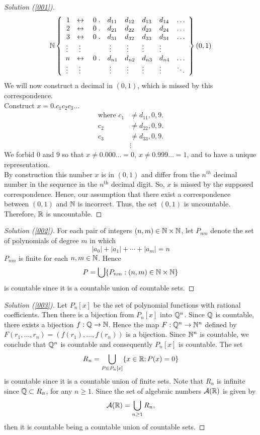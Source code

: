 \documentclass[	DIV=calc,paper=a4,fontsize=11pt]{scrartcl}	 	%
\theoremstyle{definition}
\theoremstyle{plain}
\theoremstyle{remark}
\begin{document}
\begin{proof}[Solution (\ref{001})]
  \[ \Bbb N \left\{\begin{array}{rllllll}
  1 & \leftrightarrow \quad0\;.&d_{11}&d_{12}&d_{13}&d_{14}&\ldots\\
  2 & \leftrightarrow \quad0\;.&d_{21}&d_{22}&d_{23}&d_{24}&\ldots\\
  3 & \leftrightarrow \quad0\;.&d_{31}&d_{32}&d_{33}&d_{34}&\ldots\\
  \vdots\; & \;\vdots&\;\vdots&\;\vdots\;&\vdots&\vdots \\
  n & \leftrightarrow \quad0\;.&d_{n1}&d_{n2}&d_{n3}&d_{n4}&\ldots\\
  \vdots\; & \;\vdots&\;\vdots&\;\vdots\;&\vdots&\vdots&\ddots
  \end{array}\right\} (0,1)
\]
We will now construct a decimal in $(0,1)$, which is missed by this correspondence.\\
Construct $x=0.c_1c_2c_3\ldots$
\begin{align*}
\text{where  } c_1&\neq d_{11},0,9.\\
               c_2&\neq d_{22},0,9.\\
               c_3&\neq d_{33},0,9.\\
                  &\vdots
\end{align*}
We forbid $0$ and $9$ so that $x\neq 0.000\ldots=0$, $x\neq0.999\ldots=1$, and to have a unique representation.\\
By construction this number $x$ is in $(0,1)$ and differ from the $n^{th}$ decimal number in the sequence in the $n^{\scriptscriptstyle \text{th}}$ decimal digit.
So, $x$ is missed by the supposed correspondence. Hence, our assumption that there exist a correspondence between $(0,1)$ and $\Bbb N$ is incorrect. Thus, the set $(0,1)$ is uncountable.\\
Therefore, $\Bbb R$ is uncountable.
\end{proof}
\begin{proof}[Solution (\ref{002})]
For each pair of integers $(n,m)\in \Bbb N\times \Bbb N$, let $P_{nm}$ denote the set of polynomials of degree $m$ in which
  \[|a_0|+|a_1|+\cdots+|a_m|=n\]
  $P_{nm}$ is finite for each $n,m\in \Bbb N$. Hence
  \[P=\bigcup\{P_{nm}:(n,m)\in \Bbb N\times \Bbb N\}\]
  is countable since it is a countable union of countable sets.
\end{proof}
\begin{proof}[Solution (\ref{003})]
Let $P_n[x]$ be the set of polynomial functions with rational coefficients. Then there is a bijection from $P_n[x]$ into $\Bbb Q^n$. Since $\Bbb Q$ is countable, there exists a bijection $f : \Bbb Q\to \Bbb N$. Hence the map $F : \Bbb Q^n\to \Bbb N^n$ defined by $F (r_1,\ldots, r_n) = (f(r_1),\ldots, f(r_n))$ is a bijection. Since $\Bbb N^n$ is countable, we conclude that $\Bbb Q^n$ is countable and consequently $P_n[x]$ is countable. The set
      $$R_n = \bigcup_{P\in P_n[x]}\{x \in \Bbb R; P (x) = 0\}$$
is countable since it is a countable union of finite sets. Note that $R_n$ is infinite since $\Bbb Q\subset R_n$, for any $n \geq 1$. Since the set of algebraic numbers $\mathcal{A}(\Bbb R)$ is given by
      $$\mathcal{A}(\Bbb R) = \bigcup_{n\geq 1} R_n,$$
then it is countable being a countable union of countable sets.
\end{proof}
\end{document}
